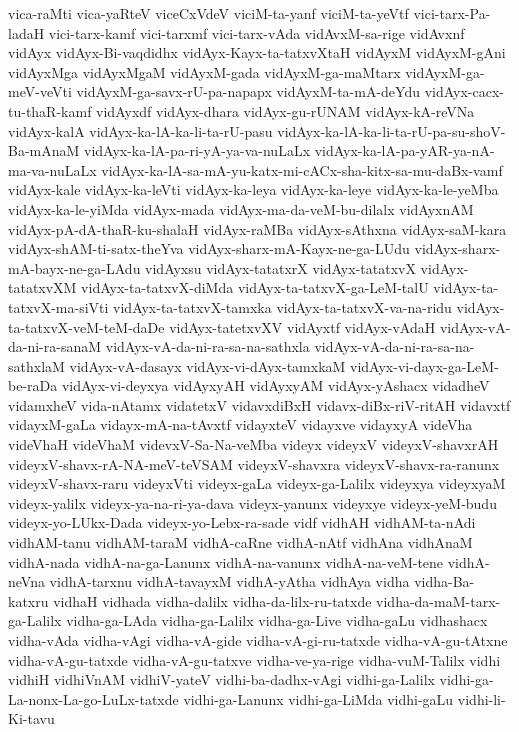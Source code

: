 {vica-raMti
vica-yaRteV
viceCxVdeV
viciM-ta-yanf
viciM-ta-yeVtf
vici-tarx-Pa-ladaH
vici-tarx-kamf
vici-tarxmf
vici-tarx-vAda
vidAvxM-sa-rige
vidAvxnf
vidAyx
vidAyx-Bi-vaqdidhx
vidAyx-Kayx-ta-tatxvXtaH
vidAyxM
vidAyxM-gAni
vidAyxMga
vidAyxMgaM
vidAyxM-gada
vidAyxM-ga-maMtarx
vidAyxM-ga-meV-veVti
vidAyxM-ga-savx-rU-pa-napapx
vidAyxM-ta-mA-deYdu
vidAyx-cacx-tu-thaR-kamf
vidAyxdf
vidAyx-dhara
vidAyx-gu-rUNAM
vidAyx-kA-reVNa
vidAyx-kalA
vidAyx-ka-lA-ka-li-ta-rU-pasu
vidAyx-ka-lA-ka-li-ta-rU-pa-su-shoV-Ba-mAnaM
vidAyx-ka-lA-pa-ri-yA-ya-va-nuLaLx
vidAyx-ka-lA-pa-yAR-ya-nA-ma-va-nuLaLx
vidAyx-ka-lA-sa-mA-yu-katx-mi-cACx-sha-kitx-sa-mu-daBx-vamf
vidAyx-kale
vidAyx-ka-leVti
vidAyx-ka-leya
vidAyx-ka-leye
vidAyx-ka-le-yeMba
vidAyx-ka-le-yiMda
vidAyx-mada
vidAyx-ma-da-veM-bu-dilalx
vidAyxnAM
vidAyx-pA-dA-thaR-ku-shalaH
vidAyx-raMBa
vidAyx-sAthxna
vidAyx-saM-kara
vidAyx-shAM-ti-satx-theYva
vidAyx-sharx-mA-Kayx-ne-ga-LUdu
vidAyx-sharx-mA-bayx-ne-ga-LAdu
vidAyxsu
vidAyx-tatatxrX
vidAyx-tatatxvX
vidAyx-tatatxvXM
vidAyx-ta-tatxvX-diMda
vidAyx-ta-tatxvX-ga-LeM-talU
vidAyx-ta-tatxvX-ma-siVti
vidAyx-ta-tatxvX-tamxka
vidAyx-ta-tatxvX-va-na-ridu
vidAyx-ta-tatxvX-veM-teM-daDe
vidAyx-tatetxvXV
vidAyxtf
vidAyx-vAdaH
vidAyx-vA-da-ni-ra-sanaM
vidAyx-vA-da-ni-ra-sa-na-sathxla
vidAyx-vA-da-ni-ra-sa-na-sathxlaM
vidAyx-vA-dasayx
vidAyx-vi-dAyx-tamxkaM
vidAyx-vi-dayx-ga-LeM-be-raDa
vidAyx-vi-deyxya
vidAyxyAH
vidAyxyAM
vidAyx-yAshacx
vidadheV
vidamxheV
vida-nAtamx
vidatetxV
vidavxdiBxH
vidavx-diBx-riV-ritAH
vidavxtf
vidayxM-gaLa
vidayx-mA-na-tAvxtf
vidayxteV
vidayxve
vidayxyA
videVha
videVhaH
videVhaM
videvxV-Sa-Na-veMba
videyx
videyxV
videyxV-shavxrAH
videyxV-shavx-rA-NA-meV-teVSAM
videyxV-shavxra
videyxV-shavx-ra-ranunx
videyxV-shavx-raru
videyxVti
videyx-gaLa
videyx-ga-Lalilx
videyxya
videyxyaM
videyx-yalilx
videyx-ya-na-ri-ya-dava
videyx-yanunx
videyxye
videyx-yeM-budu
videyx-yo-LUkx-Dada
videyx-yo-Lebx-ra-sade
vidf
vidhAH
vidhAM-ta-nAdi
vidhAM-tanu
vidhAM-taraM
vidhA-caRne
vidhA-nAtf
vidhAna
vidhAnaM
vidhA-nada
vidhA-na-ga-Lanunx
vidhA-na-vanunx
vidhA-na-veM-tene
vidhA-neVna
vidhA-tarxnu
vidhA-tavayxM
vidhA-yAtha
vidhAya
vidha
vidha-Ba-katxru
vidhaH
vidhada
vidha-dalilx
vidha-da-lilx-ru-tatxde
vidha-da-maM-tarx-ga-Lalilx
vidha-ga-LAda
vidha-ga-Lalilx
vidha-ga-Live
vidha-gaLu
vidhashacx
vidha-vAda
vidha-vAgi
vidha-vA-gide
vidha-vA-gi-ru-tatxde
vidha-vA-gu-tAtxne
vidha-vA-gu-tatxde
vidha-vA-gu-tatxve
vidha-ve-ya-rige
vidha-vuM-Talilx
vidhi
vidhiH
vidhiVnAM
vidhiV-yateV
vidhi-ba-dadhx-vAgi
vidhi-ga-Lalilx
vidhi-ga-La-nonx-La-go-LuLx-tatxde
vidhi-ga-Lanunx
vidhi-ga-LiMda
vidhi-gaLu
vidhi-li-Ki-tavu
}
